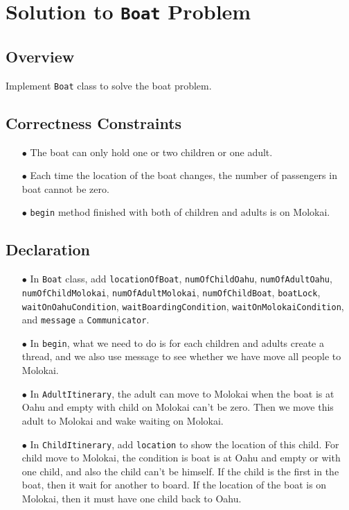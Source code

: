 \documentclass{article}
\begin{document}
\section{Solution to \texttt{Boat} Problem}
\subsection{Overview}

Implement \texttt{Boat} class to solve the boat problem.

\subsection{Correctness Constraints}

\begin{enumerate}
\item[$\bullet$] The boat can only hold one or two children or one adult.
\item[$\bullet$] Each time the location of the boat changes, the number of passengers in boat cannot be zero.
\item[$\bullet$] \texttt{begin} method finished with both of children and adults is on Molokai.
\end{enumerate}

\subsection{Declaration}

\begin{enumerate}
\item[$\bullet$] In \texttt{Boat} class, add \texttt{locationOfBoat}, \texttt{numOfChildOahu}, \texttt{numOfAdultOahu}, \texttt{numOfChildMolokai}, \texttt{numOfAdultMolokai}, \texttt{numOfChildBoat}, \texttt{boatLock}, \texttt{waitOnOahuCondition}, \texttt{waitBoardingCondition}, \texttt{waitOnMolokaiCondition}, and \texttt{message} a \texttt{Communicator}.
\item[$\bullet$] In \texttt{begin}, what we need to do is for each children and adults create a thread, and we also use message to see whether we have move all people to Molokai.
\item[$\bullet$] In \texttt{AdultItinerary}, the adult can  move to Molokai when the boat is at Oahu and empty with child on Molokai can't be zero. Then we move this adult to Molokai and wake waiting on Molokai.
\item[$\bullet$] In \texttt{ChildItinerary}, add \texttt{location} to show the location of this child. For child move to Molokai, the condition is boat is at Oahu and empty or with one child, and also the child can't be himself. If the child is the first in the boat, then it wait for another to board. If the location of the boat is on Molokai, then it must have one child back to Oahu.
\end{enumerate}
\end{document}
